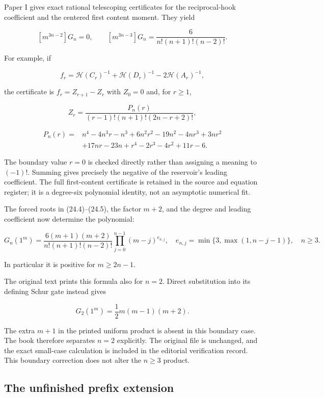 \documentclass[
  10pt,
  a4paper,
  10pt,
  oneside,
  openany]{book}
\begin{document}
Paper I gives exact rational telescoping certificates for the
reciprocal-hook coefficient and the centered first content moment. They
yield

\[
 [m^{3n-2}]G_n=0,\qquad
 [m^{3n-3}]G_n=\frac6{n!(n+1)!(n-2)!}.
 \tag{24.6}\label{eq:24.6}
\]

For example, if

\[
 f_r=\mathcal H(C_r)^{-1}+\mathcal H(D_r)^{-1}-2\mathcal H(A_r)^{-1},
\]

the certificate is \(f_r=Z_{r+1}-Z_r\) with \(Z_0=0\) and, for
\(r\ge1\),

\[
 Z_r=\frac{P_n(r)}{(r-1)!(n+1)!(2n-r+2)!},
\]

\[
\begin{aligned}
P_n(r)={}&n^4-4n^3r-n^3+6n^2r^2-19n^2-4nr^3+3nr^2\\
&+17nr-23n+r^4-2r^3-4r^2+11r-6.
\end{aligned}
\]

The boundary value \(r=0\) is checked directly rather than assigning a
meaning to \((-1)!\). Summing gives precisely the negative of the
reservoir's leading coefficient. The full first-content certificate is
retained in the source and equation register; it is a degree-six
polynomial identity, not an asymptotic numerical fit.

The forced roots in (24.4)--(24.5), the factor \(m+2\), and the degree
and leading coefficient now determine the polynomial:

\[
 \boxed{
 G_n(1^m)=
 \frac{6(m+1)(m+2)}{n!(n+1)!(n-2)!}
 \prod_{j=0}^{n-1}(m-j)^{e_{n,j}},
 \quad e_{n,j}=\min\{3,\max(1,n-j-1)\},
 \quad n\ge3.}
 \tag{24.7}\label{eq:24.7}
\]

In particular it is positive for \(m\ge2n-1\).

The original text prints this formula also for \(n=2\). Direct
substitution into its defining Schur gate instead gives

\[
 G_2(1^m)=\frac12m(m-1)(m+2).
 \tag{24.8}\label{eq:24.8}
\]

The extra \(m+1\) in the printed uniform product is absent in this
boundary case. The book therefore separates \(n=2\) explicitly. The
original file is unchanged, and the exact small-case calculation is
included in the editorial verification record. This boundary correction
does not alter the \(n\ge3\) product.

\subsection{The unfinished prefix
extension}\label{the-unfinished-prefix-extension}
\end{document}
